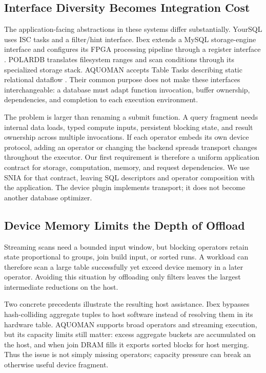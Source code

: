 \documentclass[sigconf, nonacm]{acmart}
\begin{document}
\subsection{Interface Diversity Becomes Integration Cost}
The application-facing abstractions in these systems differ substantially.
YourSQL uses ISC tasks and a filter/hint interface. Ibex extends a MySQL
storage-engine interface and configures its FPGA processing pipeline through
a register interface \cite{ibex}. POLARDB translates filesystem ranges and
scan conditions through its specialized storage stack. AQUOMAN accepts Table
Tasks describing static relational dataflow \cite{aquoman}. Their common
purpose does not make these interfaces interchangeable: a database must
adapt function invocation, buffer ownership, dependencies, and completion
to each execution environment.

The problem is larger than renaming a submit function. A query fragment
needs internal data loads, typed compute inputs, persistent blocking state,
and result ownership across multiple invocations. If each operator embeds
its own device protocol, adding an operator or changing the backend spreads
transport changes throughout the executor. Our first requirement is therefore
a uniform application contract for storage, computation, memory, and request
dependencies. We use SNIA for that contract, leaving SQL descriptors and
operator composition with the application. The device plugin implements
transport; it does not become another database optimizer.

\subsection{Device Memory Limits the Depth of Offload}
Streaming scans need a bounded input window, but blocking operators retain
state proportional to groups, join build input, or sorted runs. A workload
can therefore scan a large table successfully yet exceed device memory in
a later operator. Avoiding this situation by offloading only filters leaves
the largest intermediate reductions on the host.

Two concrete precedents illustrate the resulting host assistance. Ibex
bypasses hash-colliding aggregate tuples to host software instead of resolving
them in its hardware table. AQUOMAN supports broad operators and streaming
execution, but its capacity limits still matter: excess aggregate buckets
are accumulated on the host, and when join DRAM fills it exports sorted
blocks for host merging. Thus the issue is not simply missing operators;
capacity pressure can break an otherwise useful device fragment.
\end{document}
